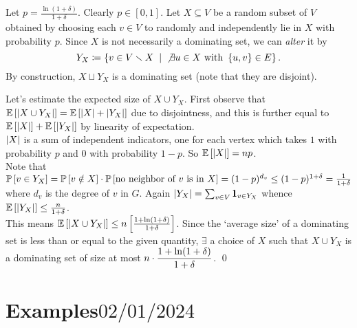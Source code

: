\begin{pf}
Let $p=\frac{\ln(1+\delta)}{1+\delta}$. Clearly $p\in [0,1]$. Let $X\subseteq V$
 be a random subset of $V$ obtained by choosing each $v\in V$ to randomly and independently lie in $X$ with probability $p$. Since $X$ is not necessarily a dominating set, we can \textit{alter} it by $$Y_X\sett\set{v\in V\smallsetminus X\st \not\exists u\in X \text{ with } \set{u,v}\in E}.$$
By construction, $X\sqcup Y_X$ is a dominating set (note that they are disjoint).

Let's estimate the expected size of $X\cup Y_X$. First observe that $\E{\abs{X\cup Y_X}} = \E{\abs X + \abs {Y_X}}$ due to disjointness, and this is further equal to $\E{\abs X} + \E{\abs {Y_X}}$ by linearity of expectation.\\
$\abs X$ is a sum of independent indicators, one for each vertex which takes $1$ with probability $p$ and $0$ with probability $1-p$. So $\E{\abs X} = np$.\\
Note that $\P{v\in Y_X} = \P{v\notin X}\cdot \P{\text{no neighbor of } v \text{ is in } X} = (1-p)^{d_v} \leq (1-p)^{1+\delta} =\frac{1}{1+\delta}$ where $d_v$ is the degree of $v$ in $G$. Again $\abs{Y_X} = \sum_{v\in V} \pmb 1_{v\in Y_X}$ whence $\E{\abs {Y_X}} \leq \frac n {1+\delta}$. \\
This means $\E{\abs{X\cup Y_X}} \leq n\left[\frac{1+\ln(1+\delta)}{1+\delta}\right]$. Since the `average size' of a dominating set is less than or equal to the given quantity, $\exists$ a choice of $X$ such that $X\cup Y_X$ is a dominating set of size at most $\ds n\cdot \frac{1+\ln(1+\delta)}{1+\delta}$.
\qed\end{pf}






\chapter{Examples\hfill\small$02/01/2024\qquad$}

